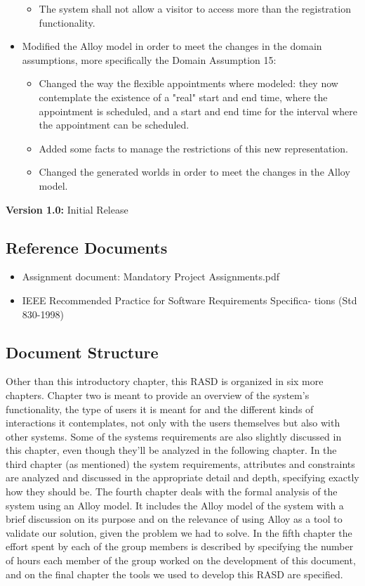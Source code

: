 \documentclass[12pt]{article}
\begin{document}
\begin{itemize}
        \begin{itemize}
            \item The system shall not allow a visitor to access more than the registration functionality.
        \end{itemize}
    \item Modified the Alloy model in order to meet the changes in the domain assumptions, more specifically the Domain Assumption 15:
        \begin{itemize}
            \item Changed the way the flexible appointments where modeled: they now contemplate the existence of a "real" start and end time, where the appointment is scheduled, and a start and end time for the interval where the appointment can be scheduled.
            \item Added some facts to manage the restrictions of this new representation.
            \item Changed the generated worlds in order to meet the changes in the Alloy model.
        \end{itemize}
\end{itemize}
\textbf{Version 1.0:} Initial Release
\subsection{Reference Documents}
    \begin{itemize}
        \item Assignment document: Mandatory Project Assignments.pdf
        \item IEEE Recommended Practice for Software Requirements Specifica- tions (Std 830-1998)
    \end{itemize}


\subsection{Document Structure}
Other than this introductory chapter, this RASD is organized in six more chapters. Chapter two is meant to provide an overview of the system's functionality, the type of users it is meant for and the different kinds of interactions it contemplates, not only with the users themselves but also with other systems. Some of the systems requirements are also slightly discussed in this chapter, even though they’ll be analyzed in the following chapter. In the third chapter (as mentioned) the system requirements, attributes and constraints are analyzed and discussed in the appropriate detail and depth, specifying exactly how they should be.
The fourth chapter deals with the formal analysis of the system using an Alloy model. It includes the Alloy model of the system with a brief discussion on its purpose and on the relevance of using Alloy as a tool to validate our solution, given the problem we had to solve.
In the fifth chapter the effort spent by each of the group members is described by specifying the number of hours each member of the group worked on the development of this document, and on the final chapter the tools we used to develop this RASD are specified.
\end{document}
